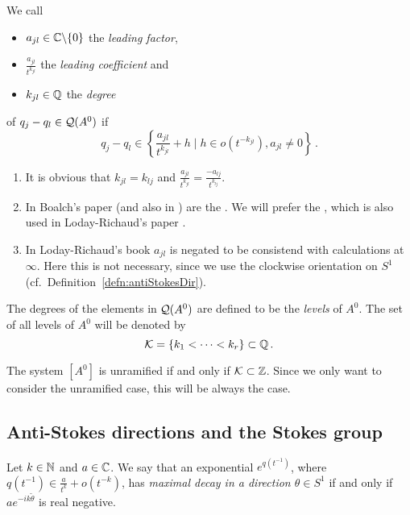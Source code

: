 \begin{defn}\label{defn:determiningPolysOfEndA}
  We call
  \begin{itemize}
    \item $a_{jl}\in\mathbb{C}\backslash\{0\}$ the \emph{leading factor},
    \item $\frac{a_{jl}}{t^{k_{jl}}}$ the \emph{leading
      coefficient} and
    \item $k_{jl}\in\mathbb{Q}$ the \emph{degree}
  \end{itemize}
  of $q_j-q_l\in\mathcal{Q}(A^0)$ if
  \[
    q_j-q_l\in\left\{\frac{a_{jl}}{t^{k_{jl}}}+h \mid h \in o(t^{-k_{jl}}),
      a_{jl}\neq0
    \right\}\,.
  \]
  \begin{s-rem}
    \begin{enumerate}
      \item It is obvious that $k_{jl}=k_{lj}$ and
        $\frac{a_{jl}}{t^{k_{jl}}}=\frac{-a_{lj}}{t^{k_{lj}}}$.
      \item In Boalch's paper \cite{boalch} (and also in \cite{thboalch}) are
        the .
        We will prefer the , which is also used in
        Loday-Richaud's paper \cite{Loday1994}.
      \item In Loday-Richaud's book \cite[Def.4.3.6]{Loday2014} $a_{jl}$ is
        negated to be consistend with calculations at $\infty$.
        Here this is not necessary, since we use the clockwise orientation on
        $S^1$ (cf.\ Definition~\ref{defn:antiStokesDir}).
    \end{enumerate}
  \end{s-rem}
  The degrees of the elements in $\mathcal{Q}(A^0)$ are defined to be  the
  \emph{levels} of $A^0$.
  The set of all levels of $A^0$ will be denoted by
  \[
    \mathcal{K}=\{k_1<\dots<k_r\} \subset \mathbb{Q} \,.
  \]
  \begin{s-rem}
    The system $[A^0]$ is unramified if and only if $\mathcal{K}\subset\mathbb{Z}$.
    Since we only want to consider the unramified case, this will be always the
    case.
  \end{s-rem}
\end{defn}

\subsection{Anti-Stokes directions and the Stokes group}
\begin{defn}
  Let $k\in\mathbb{N}$ and $a\in\mathbb{C}$.
  We say that an exponential $e^{q(t^{-1})}$, where
  $q(t^{-1})\in\frac{a}{t^{k}}+o(t^{-k})$, has \emph{maximal decay in a
  direction $\theta\in S^1$} if and only if $ae^{-ik\tilde\theta}$ is real
  negative. 
  \begin{comment}
    $be^0\in\C$ corresponding to has maximal decay if and only if \PROBLEM[$1$
    has maximal decay?]
  \end{comment}
\end{defn}

